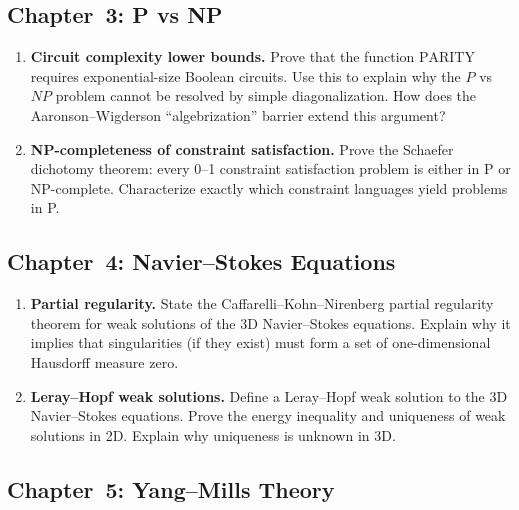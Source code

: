 \subsection{Chapter~3: P vs NP}

\begin{enumerate}[label=\textbf{A3.\arabic*.},leftmargin=2.5em]
\item \textbf{Circuit complexity lower bounds.}
Prove that the function $\text{PARITY}$ requires exponential-size Boolean circuits. Use this to explain why the $P$ vs $NP$ problem cannot be resolved by simple diagonalization. How does the Aaronson--Wigderson ``algebrization'' barrier extend this argument?

\item \textbf{NP-completeness of constraint satisfaction.}
Prove the Schaefer dichotomy theorem: every 0--1 constraint satisfaction problem is either in P or NP-complete. Characterize exactly which constraint languages yield problems in P.
\end{enumerate}

\subsection{Chapter~4: Navier--Stokes Equations}

\begin{enumerate}[label=\textbf{A4.\arabic*.},leftmargin=2.5em]
\item \textbf{Partial regularity.}
State the Caffarelli--Kohn--Nirenberg partial regularity theorem for weak solutions of the 3D Navier--Stokes equations. Explain why it implies that singularities (if they exist) must form a set of one-dimensional Hausdorff measure zero.

\item \textbf{Leray--Hopf weak solutions.}
Define a Leray--Hopf weak solution to the 3D Navier--Stokes equations. Prove the energy inequality and uniqueness of weak solutions in 2D. Explain why uniqueness is unknown in 3D.
\end{enumerate}

\subsection{Chapter~5: Yang--Mills Theory}

